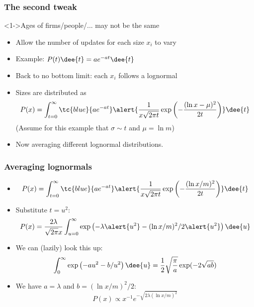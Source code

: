 \begin{frame}
  \frametitle{The second tweak}

  \begin{block}<1->{Ages of firms/people/... may not be the same}
    \begin{itemize}
    \item<2-> Allow the number of updates for each size $x_i$
      to vary
    \item<3-> Example: $ P(t) \dee{t} = ae^{-at} \dee{t} $
    \item<4-> Back to no bottom limit: each $x_i$ follows
      a lognormal
    \item<5->
      Sizes are distributed as\cite{mitzenmacher2003a}
      $$
      P(x) = \int_{t=0}^\infty
      \tc{blue}{a e^{-at}}
      \alert{
      \frac{1}{x \sqrt{2\pi t}}
      \exp
      \left(
        -\frac{(\ln x - \mu)^2}
        {2t}
      \right)
      }
      \dee{t}
      $$
      (Assume for this example that $\sigma \sim t$ and $\mu = \ln m$)
      \item<6->
      Now averaging different lognormal distributions.
    \end{itemize}
  \end{block}

\end{frame}

\begin{frame}
  \frametitle{Averaging lognormals}

    \begin{itemize}
    \item<1->
      $$
      P(x) = \int_{t=0}^\infty
      \tc{blue}{a e^{-at}}
      \alert{
        \frac{1}{x \sqrt{2\pi t}}
        \exp
        \left(
          -\frac{(\ln x/m)^2}
          {2t}
        \right)
      }
      \dee{t}
      $$
    \item<2->
      Substitute $t = u^2$:
      $$
      P(x) = 
      \frac{2\lambda}{\sqrt{2\pi}x}
      \int_{u=0}^{\infty}
      \exp
      \left(
        -\lambda \alert{u^2}
        -(\ln x/m)^2 / 2 \alert{u^2} 
      \right)
      \dee{u}
      $$
    \item<3->
      We can (lazily) look this up:\cite{gradshteyn1965a}
      $$
      \int_{0}^{\infty} \exp \left( -au^2 - b/u^2 \right) \dee{u}
      = 
      \frac{1}{2}\sqrt{\frac{\pi}{a}} \exp(-2\sqrt{ab})
      $$
    \item<4->
      We have $a = \lambda$ and $b=(\ln x/m)^2/2$:
      $$
      P(x)
      \propto
      x^{-1} e^{- \sqrt{2\lambda (\ln x/m) ^2}} 
      $$
    \end{itemize}

\end{frame}

